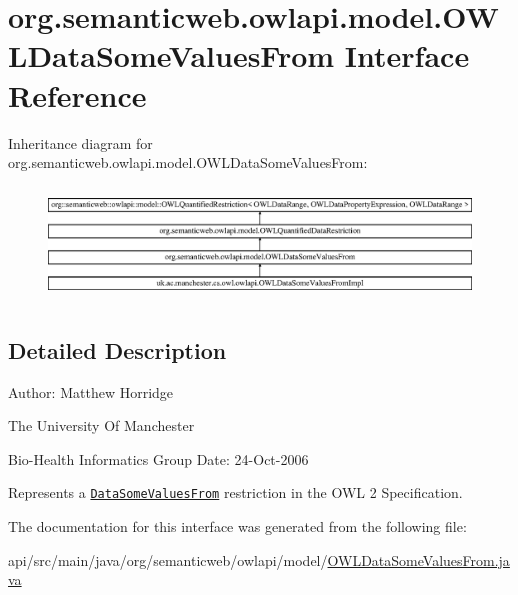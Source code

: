 \hypertarget{interfaceorg_1_1semanticweb_1_1owlapi_1_1model_1_1_o_w_l_data_some_values_from}{\section{org.\-semanticweb.\-owlapi.\-model.\-O\-W\-L\-Data\-Some\-Values\-From Interface Reference}
\label{interfaceorg_1_1semanticweb_1_1owlapi_1_1model_1_1_o_w_l_data_some_values_from}
}
Inheritance diagram for org.\-semanticweb.\-owlapi.\-model.\-O\-W\-L\-Data\-Some\-Values\-From\-:\begin{figure}[H]
\begin{center}
\leavevmode
\includegraphics[height=3.043478cm]{interfaceorg_1_1semanticweb_1_1owlapi_1_1model_1_1_o_w_l_data_some_values_from}
\end{center}
\end{figure}


\subsection{Detailed Description}
Author\-: Matthew Horridge\par
 The University Of Manchester\par
 Bio-\/\-Health Informatics Group Date\-: 24-\/\-Oct-\/2006 

Represents a \href{http://www.w3.org/TR/2009/REC-owl2-syntax-20091027/#Existential_Quantification_2}{\tt Data\-Some\-Values\-From} restriction in the O\-W\-L 2 Specification. 

The documentation for this interface was generated from the following file\-:\begin{DoxyCompactItemize}
\item 
api/src/main/java/org/semanticweb/owlapi/model/\hyperlink{_o_w_l_data_some_values_from_8java}{O\-W\-L\-Data\-Some\-Values\-From.\-java}\end{DoxyCompactItemize}
